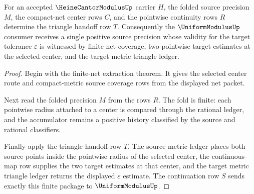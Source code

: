 \begin{theorem}
\label{thm:heine-cantor-modulus-triangle-handoff}
For an accepted $\HeineCantorModulusUp$ carrier $H$, the folded source
precision $M$, the compact-net center rows $C$, and the pointwise continuity
rows $R$ determine the triangle handoff row $T$. Consequently the
$\UniformModulusUp$ consumer receives a single positive source precision whose
validity for the target tolerance $\varepsilon$ is witnessed by finite-net
coverage, two pointwise target estimates at the selected center, and the
target metric triangle ledger.
\end{theorem}
\begin{proof}
Begin with the finite-net extraction theorem. It gives the selected center
route and compact-metric source coverage rows from the displayed net packet.

Next read the folded precision $M$ from the rows $R$. The fold is finite:
each pointwise radius attached to a center is compared through the rational
ledger, and the accumulator remains a positive history classified by the
source and rational classifiers.

Finally apply the triangle handoff row $T$. The source metric ledger places
both source points inside the pointwise radius of the selected center, the
continuous-map row supplies the two target estimates at that center, and the
target metric triangle ledger returns the displayed $\varepsilon$ estimate.
The continuation row $S$ sends exactly this finite package to
$\UniformModulusUp$.
\end{proof}

